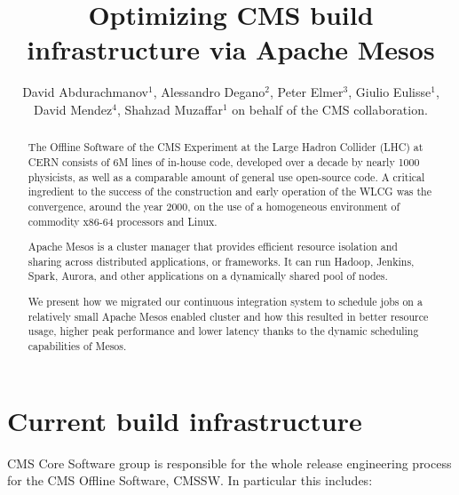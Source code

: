 \documentclass[a4paper]{jpconf}
\begin{document}

\title{Optimizing CMS build infrastructure via Apache Mesos}

\author{David Abdurachmanov$^1$, Alessandro Degano$^2$, Peter Elmer$^3$, Giulio
Eulisse$^1$, David Mendez$^4$, Shahzad Muzaffar$^1$ on behalf of the CMS collaboration.}

\address{$^1$ Fermilab, Batavia, IL 60510, USA}
\address{$^2$ Università di Torino}
\address{$^3$ Department of Physics, Princeton University, Princeton, NJ 08540,
USA}
\address{$^4$ Universidad de los Andes, Bogotá, Colombia}



\begin{abstract}

The Offline Software of the CMS Experiment at the Large Hadron Collider (LHC) at
CERN consists of 6M lines of in-house code, developed over a decade by nearly
1000 physicists, as well as a comparable amount of general use open-source code.
A critical ingredient to the success of the construction and early operation of
the WLCG was the convergence, around the year 2000, on the use of a homogeneous
environment of commodity x86-64 processors and Linux.

Apache Mesos is a cluster manager that provides efficient resource isolation and
sharing across distributed applications, or frameworks. It can run Hadoop,
Jenkins, Spark, Aurora, and other applications on a dynamically shared pool of
nodes.

We present how we migrated our continuous integration system to schedule jobs on
a relatively small Apache Mesos enabled cluster and how this resulted in better
resource usage, higher peak performance and lower latency thanks to the dynamic
scheduling capabilities of Mesos.

\end{abstract}


\section{Current build infrastructure}

CMS Core Software group is responsible for the whole release engineering process
for the CMS Offline Software, CMSSW. In particular this includes:
\end{document}

